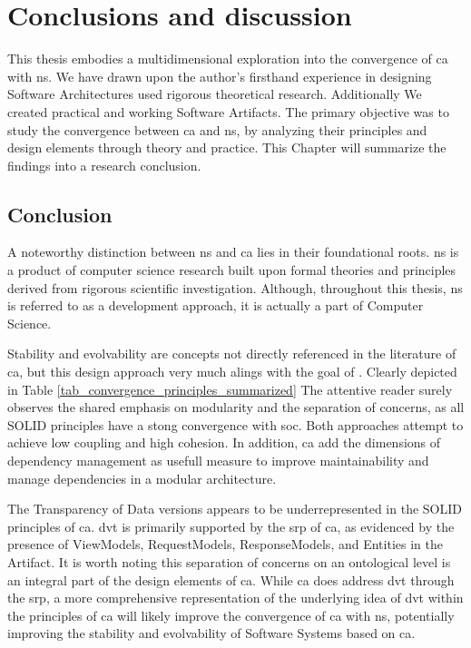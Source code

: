 \chapter{Conclusions and discussion} \label{chap_conclusions}

This thesis embodies a multidimensional exploration into the convergence of \gls{ca} with
\gls{ns}. We have drawn upon the author's firsthand experience in designing Software
Architectures used rigorous theoretical research. Additionally We created practical and
working Software Artifacts. The primary objective was to study the convergence between
\gls{ca} and \gls{ns}, by analyzing their principles and design elements through theory
and practice. This Chapter will summarize the findings into a research conclusion.

\section{Conclusion}

A noteworthy distinction between \gls{ns} and \gls{ca} lies in their foundational roots.
\gls{ns} is a product of computer science research built upon formal theories and
principles derived from rigorous scientific investigation. Although, throughout this
thesis, \gls{ns} is referred to as a development approach, it is actually a part of
Computer Science.

Stability and evolvability are concepts not directly referenced in the literature of
\gls{ca}, but this design approach very much alings with the goal of
\textcite[31]{mannaert_normalized_2016}. Clearly depicted in Table
\ref{tab_convergence_principles_summarized} The attentive reader surely observes the
shared emphasis on modularity and the separation of concerns, as all SOLID principles have
a stong convergence with \gls{soc}. Both approaches attempt to achieve low coupling and
high cohesion. In addition, \gls{ca} add the dimensions of dependency management as
usefull measure to improve maintainability and manage dependencies in a modular
architecture.

The Transparency of Data versions appears to be underrepresented in the SOLID principles
of \gls{ca}. \gls{dvt} is primarily supported by the \gls{srp} of \gls{ca}, as evidenced
by the presence of ViewModels, RequestModels, ResponseModels, and Entities in the
Artifact. It is worth noting this separation of concerns on an ontological level is an
integral part of the design elements of \gls{ca}. While \gls{ca} does address \gls{dvt}
through the \gls{srp}, a more comprehensive representation of the underlying idea of
\gls{dvt} within the principles of \gls{ca} will likely improve the convergence of
\gls{ca} with \gls{ns}, potentially improving the stability and evolvability of Software
Systems based on \gls{ca}.

